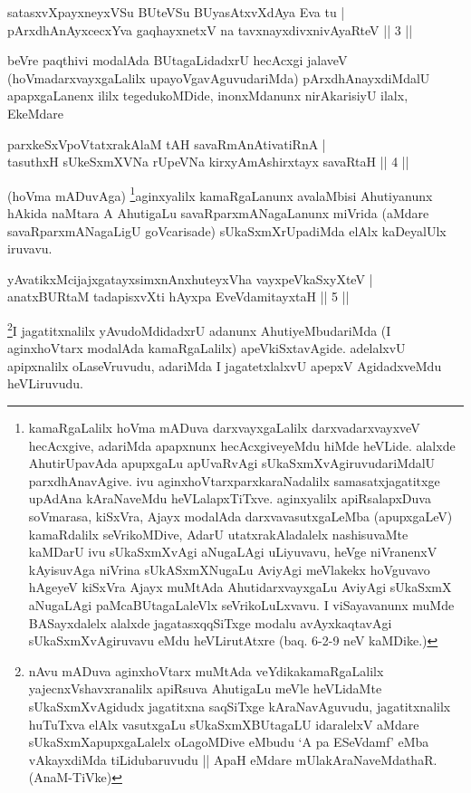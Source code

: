 \begin{shl}
satasxvXpayxneyxVSu BUteVSu BUyasAtxvXdAya Eva tu | \\
pArxdhAnAyxcecxYva gaqhayxnetxV na tavxnayxdivxnivAyaRteV \hfill ||  3 || 
\end{shl}

\begin{artha}
beVre paqthivi modalAda BUtagaLidadxrU hecAcxgi jalaveV (hoVmadarxvayxgaLalilx upayoVgavAguvudariMda) pArxdhAnayxdiMdalU apapxgaLanenx ililx tegedukoMDide, inonxMdanunx nirAkarisiyU ilalx, EkeMdare \mdash 
\end{artha}

\begin{shl}
parxkeSxVpoVtatxrakAlaM tAH savaRmAnAtivatiRnA | \\
tasuthxH sUkeSxmXVNa rUpeVNa kirxyAmAshirxtayx savaRtaH \hfill ||  4 || 
\end{shl}

\begin{artha}
(hoVma mADuvAga) \footnote{kamaRgaLalilx hoVma mADuva darxvayxgaLalilx darxvadarxvayxveV hecAcxgive, adariMda apapxnunx hecAcxgiveyeMdu hiMde heVLide. alalxde AhutirUpavAda apupxgaLu apUvaRvAgi sUkaSxmXvAgiruvudariMdalU parxdhAnavAgive. ivu aginxhoVtarxparxkaraNadalilx samasatxjagatitxge upAdAna kAraNaveMdu heVLalapxTiTxve. aginxyalilx apiRsalapxDuva soVmarasa, kiSxVra, Ajayx modalAda darxvavasutxgaLeMba (apupxgaLeV) kamaRdalilx seVrikoMDive, AdarU utatxrakAladalelx nashisuvaMte kaMDarU ivu sUkaSxmXvAgi aNugaLAgi uLiyuvavu, heVge niVranenxV kAyisuvAga niVrina sUkASxmXNugaLu AviyAgi meVlakekx hoVguvavo hAgeyeV kiSxVra Ajayx muMtAda AhutidarxvayxgaLu AviyAgi sUkaSxmX aNugaLAgi paMcaBUtagaLaleVlx seVrikoLuLxvavu. I viSayavanunx muMde BASayxdalelx alalxde jagatasxqqSiTxge modalu avAyxkaqtavAgi sUkaSxmXvAgiruvavu eMdu heVLirutAtxre (baq. 6-2-9 neV kaMDike.)}aginxyalilx kamaRgaLanunx avalaMbisi Ahutiyanunx hAkida naMtara A AhutigaLu savaRparxmANagaLanunx miVrida (aMdare savaRparxmANagaLigU goVcarisade) sUkaSxmXrUpadiMda elAlx kaDeyalUlx iruvavu.
\end{artha}


\begin{shl}
yAvatikxMcijajxgatayxsimxnAnxhuteyxVha vayxpeVkaSxyXteV | \\
anatxBURtaM tadapisxvXti hAyxpa EveVdamitayxtaH \hfill ||  5 || 
\end{shl}

\begin{artha}
\footnote{nAvu mADuva aginxhoVtarx muMtAda veYdikakamaRgaLalilx yajecnxVshavxranalilx apiRsuva AhutigaLu meVle heVLidaMte sUkaSxmXvAgidudx jagatitxna saqSiTxge kAraNavAguvudu, jagatitxnalilx huTuTxva elAlx vasutxgaLu sUkaSxmXBUtagaLU idaralelxV aMdare sUkaSxmXapupxgaLalelx oLagoMDive eMbudu `A pa ESeVdamf' eMba vAkayxdiMda tiLidubaruvudu || ApaH eMdare mUlakAraNaveMdathaR. (AnaM-TiVke)}I jagatitxnalilx yAvudoMdidadxrU adanunx AhutiyeMbudariMda (I aginxhoVtarx modalAda kamaRgaLalilx) apeVkiSxtavAgide. adelalxvU apipxnalilx oLaseVruvudu, adariMda I jagatetxlalxvU apepxV AgidadxveMdu heVLiruvudu.
\end{artha}

